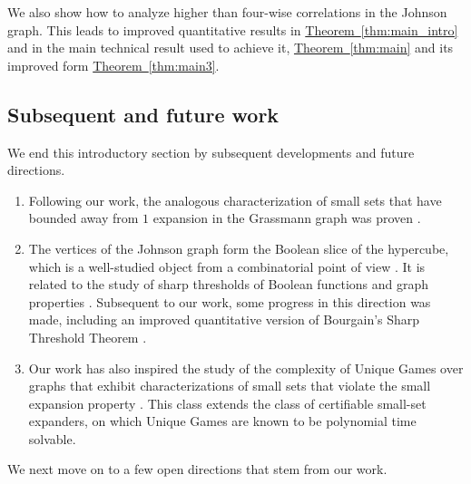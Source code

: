 \documentclass[11pt]{article}
\newcommand{\expref}[2]{\texorpdfstring{\hyperref[#2]{#1~\ref{#2}}}{#1~\ref{#2}}}
\begin{document}
We also show how to analyze higher than four-wise correlations in the Johnson graph. %
This leads to improved quantitative results in
\expref{Theorem}{thm:main_intro} and in the main technical result used to achieve it, \expref{Theorem}{thm:main} and its improved form \expref{Theorem}{thm:main3}.


\subsection{Subsequent and future work}
We end this introductory section by subsequent developments and future directions.
\begin{enumerate}
  \item Following our work, the analogous characterization of small sets that have bounded away from $1$ expansion in the Grassmann graph was proven \cite{KMS2}.%

  \item The vertices of the Johnson graph %
  form the Boolean slice of the hypercube, which is a well-studied object from a combinatorial point of view \cite{F16a,F16b,FKMW16,FM16}. It is related to the study of sharp thresholds of Boolean functions and graph properties \cite{Bourgain}. Subsequent to our work, some progress in this direction \cite{KLLM} was made, including an improved quantitative version of Bourgain's Sharp Threshold Theorem \cite{Bourgain}.

  \item Our work has also inspired the study of the complexity of Unique Games over graphs that exhibit characterizations of small sets that violate the small expansion property \cite{bafna2021playing,bafna2023solving}. This class extends the class of certifiable
      small-set expanders, on which Unique Games are known to be polynomial time solvable.
\end{enumerate}
We next move on to a few open directions that stem from our work.
\end{document}
